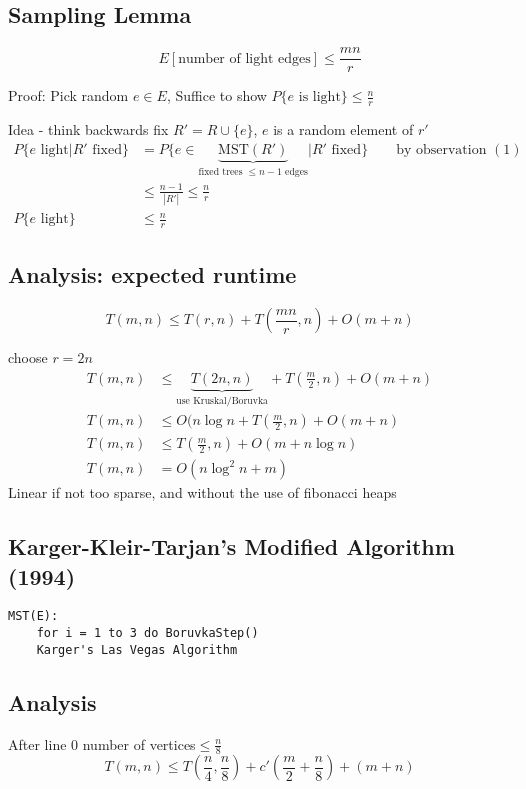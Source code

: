 \documentclass[english,12pt]{article}
\theoremstyle{plain}
\theoremstyle{definition}
\theoremstyle{definition} %
\begin{document}
\subsection{Sampling Lemma}
\[E\left[\text{number of light edges}\right]\le \frac{mn}{r}\]

Proof: Pick random $e\in E$, Suffice to show $P\{e\text{ is light}\}\le \frac{n}{r}$

Idea - think backwards
fix $R'=R\cup\{e\}$, $e$ is a random element of $r'$
\begin{align*}
P\{e\text{ light}|R'\text{ fixed}\} &= P\{e\in\underbrace{\text{MST}(R')}_{\text{fixed trees }\le n-1\text{ edges}}|R'\text{ fixed}\} \qquad \text{by observation } (1)\\
&\le \frac{n-1}{|R'|}
\le \frac{n}{r}\\
P\{e\text{ light}\} &\le \frac{n}{r}
\end{align*}

\subsection{Analysis: expected runtime}
\[T(m,n)\le T(r,n) + T\left(\frac{mn}{r}, n\right)+O(m+n)\]

choose $r=2n$
\begin{align*}
T(m,n)&\le \underbrace{T(2n,n)}_{\text{use Kruskal/Boruvka}} + T\left(\frac{m}{2}, n\right)+O(m+n)\\
T(m,n)&\le O(n\log n + T\left(\frac{m}{2}, n\right)+O(m+n)\\
T(m,n)&\le T\left(\frac{m}{2}, n\right)+O(m+n\log n)\\
T(m,n) &= O(n\log^2n + m)
\end{align*}
Linear if not too sparse, and without the use of fibonacci heaps

\subsection{Karger-Kleir-Tarjan's Modified Algorithm (1994)}
\begin{verbatim}
MST(E):
    for i = 1 to 3 do BoruvkaStep()
    Karger's Las Vegas Algorithm
\end{verbatim}

\subsection{Analysis}
After line 0 number of vertices$\le\frac{n}{8}$
\[T(m,n)\le T\left(\frac{n}{4},\frac{n}{8}\right)+c'\left(\frac{m}{2}+\frac{n}{8}\right)+(m+n)\]
\end{document}
